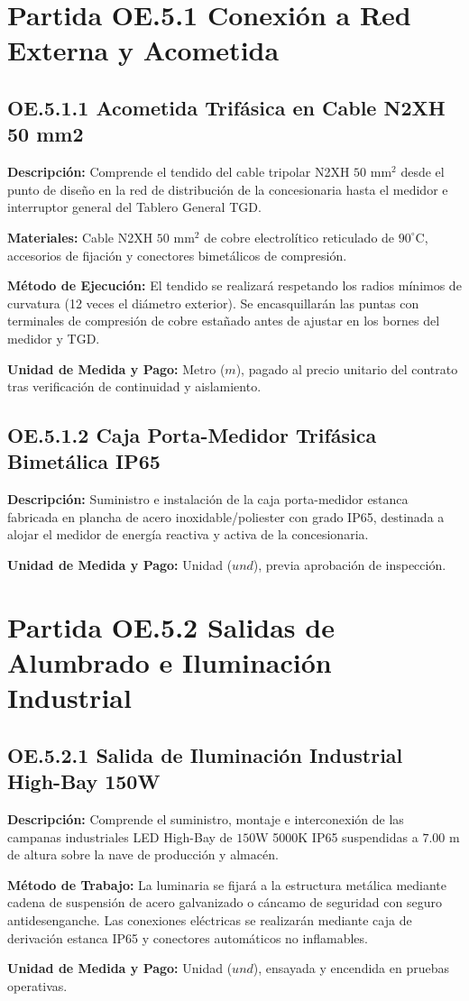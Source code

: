 \section{Partida OE.5.1 Conexión a Red Externa y Acometida}

\subsection{OE.5.1.1 Acometida Trifásica en Cable N2XH 50 mm2}
\textbf{Descripción:} Comprende el tendido del cable tripolar N2XH $50\text{ mm}^2$ desde el punto de diseño en la red de distribución de la concesionaria hasta el medidor e interruptor general del Tablero General TGD.

\textbf{Materiales:} Cable N2XH $50\text{ mm}^2$ de cobre electrolítico reticulado de $90^\circ\text{C}$, accesorios de fijación y conectores bimetálicos de compresión.

\textbf{Método de Ejecución:} El tendido se realizará respetando los radios mínimos de curvatura (12 veces el diámetro exterior). Se encasquillarán las puntas con terminales de compresión de cobre estañado antes de ajustar en los bornes del medidor y TGD.

\textbf{Unidad de Medida y Pago:} Metro ($m$), pagado al precio unitario del contrato tras verificación de continuidad y aislamiento.

\subsection{OE.5.1.2 Caja Porta-Medidor Trifásica Bimetálica IP65}
\textbf{Descripción:} Suministro e instalación de la caja porta-medidor estanca fabricada en plancha de acero inoxidable/poliester con grado IP65, destinada a alojar el medidor de energía reactiva y activa de la concesionaria.

\textbf{Unidad de Medida y Pago:} Unidad ($und$), previa aprobación de inspección.

\section{Partida OE.5.2 Salidas de Alumbrado e Iluminación Industrial}

\subsection{OE.5.2.1 Salida de Iluminación Industrial High-Bay 150W}
\textbf{Descripción:} Comprende el suministro, montaje e interconexión de las campanas industriales LED High-Bay de $150\text{W}$ 5000K IP65 suspendidas a $7.00\text{ m}$ de altura sobre la nave de producción y almacén.

\textbf{Método de Trabajo:} La luminaria se fijará a la estructura metálica mediante cadena de suspensión de acero galvanizado o cáncamo de seguridad con seguro antidesenganche. Las conexiones eléctricas se realizarán mediante caja de derivación estanca IP65 y conectores automáticos no inflamables.

\textbf{Unidad de Medida y Pago:} Unidad ($und$), ensayada y encendida en pruebas operativas.
